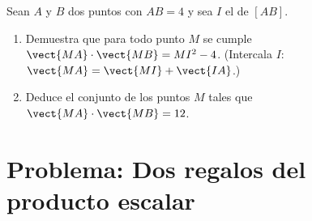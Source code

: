 \begin{exercise}[$\star\star\star$]\label{exo:g11:scal:11}
Sean $A$ y $B$ dos puntos con $AB = 4$ y sea $I$ el  de
$[AB]$.
\begin{enumerate}
  \item Demuestra que para todo punto $M$ se cumple
        $\vect{MA}\cdot\vect{MB} = MI^2 - 4$. (Intercala $I$:
        $\vect{MA} = \vect{MI} + \vect{IA}$.)
  \item Deduce el conjunto de los puntos $M$ tales que
        $\vect{MA}\cdot\vect{MB} = 12$.
\end{enumerate}
\end{exercise}

\section{Problema: Dos regalos del producto escalar}

